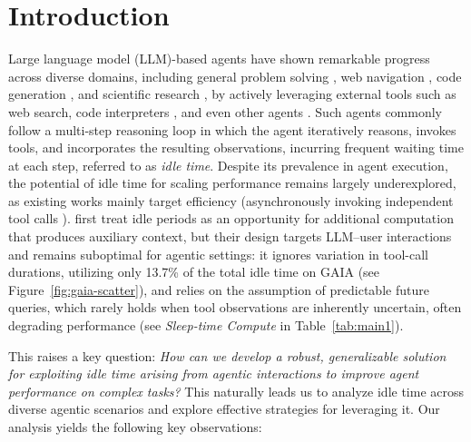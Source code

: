 \section{Introduction}
\label{sec:intro}


Large language model (LLM)-based agents \cite{yao2022react, sarukkai2025react2} have shown remarkable progress across diverse domains, including general problem solving \cite{mialon2023gaia, phan2025humanity}, web navigation \cite{zhou2023webarena, deng2023mind2web}, code generation \cite{jimenez2023swe, chan2024mle-bench}, and scientific research \cite{lu2024ai}, by actively leveraging external tools such as web search, code interpreters \cite{zhang2024codeagent}, and even other agents \cite{zhang2025agentastool, jiang2025agentadaptation}. Such agents commonly follow a multi-step reasoning loop \cite{yao2022react} in which the agent iteratively reasons, invokes tools, and incorporates the resulting observations, incurring frequent waiting time at each step, referred to as \textit{idle time}. Despite its prevalence in agent execution, the potential of idle time for scaling performance remains largely underexplored, as existing works mainly target efficiency (\eg asynchronously invoking independent tool calls \cite{gim2024async1}). \citet{lin2025sleeptime} first treat idle periods as an opportunity for additional computation that produces auxiliary context, but their design targets LLM–user interactions and remains suboptimal for agentic settings: it ignores variation in tool-call durations, utilizing only 13.7\% of the total idle time on GAIA (see Figure~\ref{fig:gaia-scatter}), and relies on the assumption of predictable future queries, which rarely holds when tool observations are inherently uncertain, often degrading performance (see \textit{Sleep-time Compute} in Table~\ref{tab:main1}).




This raises a key question:
\textit{How can we develop a robust, generalizable solution for exploiting idle time arising from agentic interactions to improve agent performance on complex tasks?
} This naturally leads us to analyze idle time across diverse agentic scenarios and explore effective strategies for leveraging it. Our analysis yields the following key observations: 

